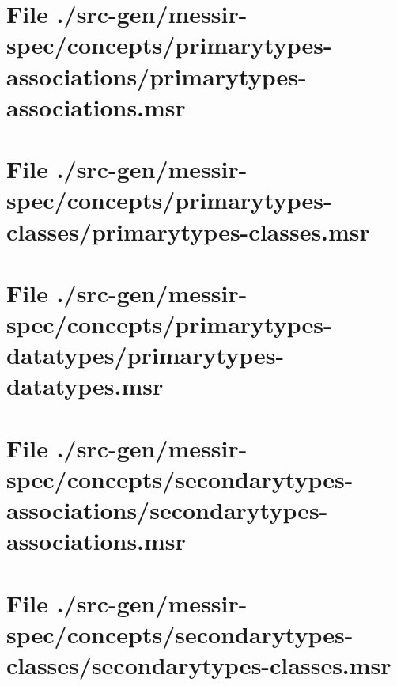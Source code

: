\section[File /src-gen/messir-spec/concepts.../primarytypes-associations.msr]{File ./src-gen/messir-spec/concepts/primarytypes-associations/primarytypes-associations.msr}
\scriptsize

\normalsize
	
\section[File /src-gen/messir-spec/concepts/primarytypes-classes/primarytypes-classes.msr]{File ./src-gen/messir-spec/concepts/primarytypes-classes/primarytypes-classes.msr}
\scriptsize

\normalsize
	
\section[File /src-gen/messir-spec/concepts.../primarytypes-datatypes.msr]{File ./src-gen/messir-spec/concepts/primarytypes-datatypes/primarytypes-datatypes.msr}
\scriptsize

\normalsize
	
\section[File /src-gen/messir-spec/concepts.../secondarytypes-associations.msr]{File ./src-gen/messir-spec/concepts/secondarytypes-associations/secondarytypes-associations.msr}
\scriptsize

\normalsize
	
\section[File /src-gen/messir-spec/concepts.../secondarytypes-classes.msr]{File ./src-gen/messir-spec/concepts/secondarytypes-classes/secondarytypes-classes.msr}
\scriptsize

\normalsize
	
